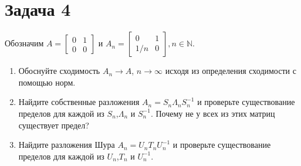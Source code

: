 \documentclass{article}
\begin{document}
		\section*{Задача 4}
		Обозначим $A = \begin{bmatrix}0 & 1 \\ 0 & 0 \end{bmatrix}$ и $A_n = \begin{bmatrix} 0 & 1 \\ 1/n & 0 \end{bmatrix}, n\in\mathbb{N}$.
		\begin{enumerate}
			\item Обоснуйте сходимость $A_n\to A$, $n\to\infty$ исходя из определения сходимости с помощью норм.
			\item Найдите собственные разложения $A_n = S_n \Lambda_n S_n^{-1}$ и проверьте существование пределов для каждой из $S_n$,$\Lambda_n$ и $S_n^{-1}$. Почему не у всех из этих матриц существует предел?
			\item Найдите разложения Шура $A_n = U_n T_n U_n^{-1}$ и проверьте существование пределов для каждой из $U_n$,$T_n$ и $U_n^{-1}$.
		\end{enumerate}
\end{document}
